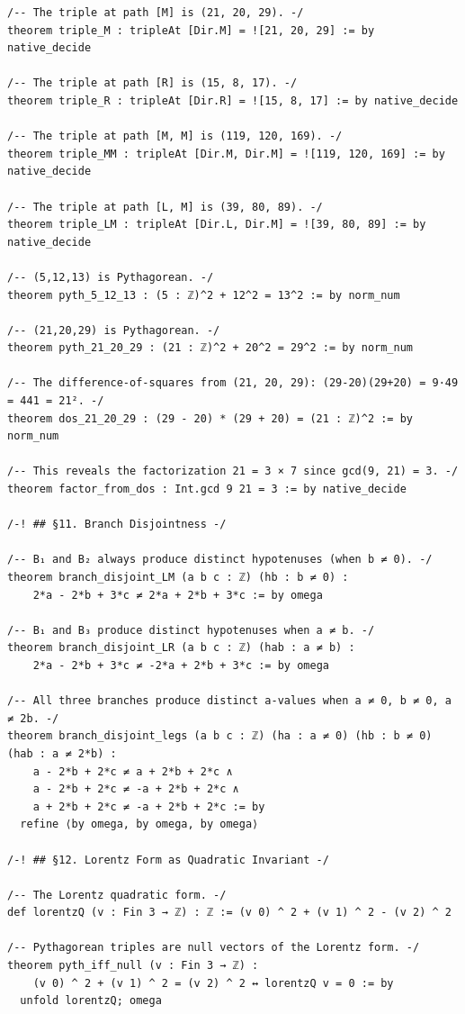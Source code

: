 \documentclass[11pt,openany]{book}
\theoremstyle{definition}
\theoremstyle{plain}
\theoremstyle{remark}
\begin{document}
\begin{lstlisting}[style=lean]
/-- The triple at path [M] is (21, 20, 29). -/
theorem triple_M : tripleAt [Dir.M] = ![21, 20, 29] := by native_decide

/-- The triple at path [R] is (15, 8, 17). -/
theorem triple_R : tripleAt [Dir.R] = ![15, 8, 17] := by native_decide

/-- The triple at path [M, M] is (119, 120, 169). -/
theorem triple_MM : tripleAt [Dir.M, Dir.M] = ![119, 120, 169] := by native_decide

/-- The triple at path [L, M] is (39, 80, 89). -/
theorem triple_LM : tripleAt [Dir.L, Dir.M] = ![39, 80, 89] := by native_decide

/-- (5,12,13) is Pythagorean. -/
theorem pyth_5_12_13 : (5 : ℤ)^2 + 12^2 = 13^2 := by norm_num

/-- (21,20,29) is Pythagorean. -/
theorem pyth_21_20_29 : (21 : ℤ)^2 + 20^2 = 29^2 := by norm_num

/-- The difference-of-squares from (21, 20, 29): (29-20)(29+20) = 9·49 = 441 = 21². -/
theorem dos_21_20_29 : (29 - 20) * (29 + 20) = (21 : ℤ)^2 := by norm_num

/-- This reveals the factorization 21 = 3 × 7 since gcd(9, 21) = 3. -/
theorem factor_from_dos : Int.gcd 9 21 = 3 := by native_decide

/-! ## §11. Branch Disjointness -/

/-- B₁ and B₂ always produce distinct hypotenuses (when b ≠ 0). -/
theorem branch_disjoint_LM (a b c : ℤ) (hb : b ≠ 0) :
    2*a - 2*b + 3*c ≠ 2*a + 2*b + 3*c := by omega

/-- B₁ and B₃ produce distinct hypotenuses when a ≠ b. -/
theorem branch_disjoint_LR (a b c : ℤ) (hab : a ≠ b) :
    2*a - 2*b + 3*c ≠ -2*a + 2*b + 3*c := by omega

/-- All three branches produce distinct a-values when a ≠ 0, b ≠ 0, a ≠ 2b. -/
theorem branch_disjoint_legs (a b c : ℤ) (ha : a ≠ 0) (hb : b ≠ 0) (hab : a ≠ 2*b) :
    a - 2*b + 2*c ≠ a + 2*b + 2*c ∧
    a - 2*b + 2*c ≠ -a + 2*b + 2*c ∧
    a + 2*b + 2*c ≠ -a + 2*b + 2*c := by
  refine ⟨by omega, by omega, by omega⟩

/-! ## §12. Lorentz Form as Quadratic Invariant -/

/-- The Lorentz quadratic form. -/
def lorentzQ (v : Fin 3 → ℤ) : ℤ := (v 0) ^ 2 + (v 1) ^ 2 - (v 2) ^ 2

/-- Pythagorean triples are null vectors of the Lorentz form. -/
theorem pyth_iff_null (v : Fin 3 → ℤ) :
    (v 0) ^ 2 + (v 1) ^ 2 = (v 2) ^ 2 ↔ lorentzQ v = 0 := by
  unfold lorentzQ; omega


\end{lstlisting}
\end{document}

